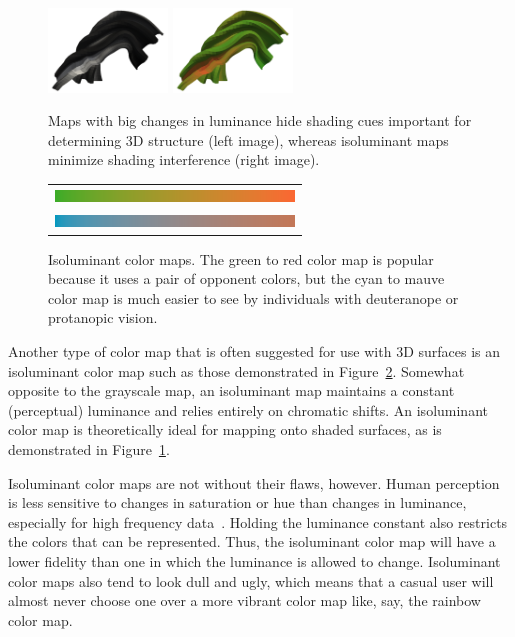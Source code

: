\documentclass{vgtc}                          %
\newcommand{\lcite}[1]{~\cite{#1}}
\begin{document}
\begin{figure}
  \centering
  \includegraphics[width=1.25in]{images/GrayscaleShading}
  \includegraphics[width=1.25in]{images/IsoluminantShading}
  \caption{Maps with big changes in luminance hide shading cues important
    for determining 3D structure (left image), whereas isoluminant maps
    minimize shading interference (right image).}
  \label{fig:LuminanceVsShading}
\end{figure}

\begin{figure}
  \centering
  \begin{tabular}{c}
    \includegraphics[width=2.5in]{images/Green2RedBar} \\
    \includegraphics[width=2.5in]{images/Cyan2MauveBar}
  \end{tabular}
  \caption{Isoluminant color maps.  The green to red color map is popular
    because it uses a pair of opponent colors, but the cyan to mauve color
    map is much easier to see by individuals with deuteranope or protanopic
    vision.}
  \label{fig:IsoluminantColorMap}
\end{figure}
Another type of color map that is often suggested for use with 3D surfaces
is an isoluminant color map such as those demonstrated in
Figure~\ref{fig:IsoluminantColorMap}.  Somewhat opposite to the grayscale
map, an isoluminant map maintains a constant (perceptual) luminance and
relies entirely on chromatic shifts.  An isoluminant color map is
theoretically ideal for mapping onto shaded surfaces, as is demonstrated in
Figure~\ref{fig:LuminanceVsShading}.

Isoluminant color maps are not without their flaws, however.  Human
perception is less sensitive to changes in saturation or hue than changes
in luminance, especially for high frequency data\lcite{Rogowitz96}.
Holding the luminance constant also restricts the colors that can be
represented.  Thus, the isoluminant color map will have a lower fidelity
than one in which the luminance is allowed to change.  Isoluminant color
maps also tend to look dull and ugly, which means that a casual user will
almost never choose one over a more vibrant color map like, say, the
rainbow color map.
\end{document}
